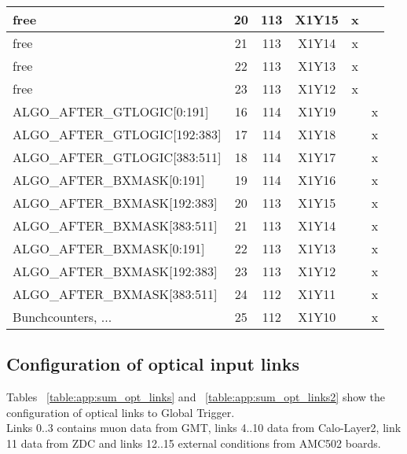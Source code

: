 \begin{longtable}{|l|c|c|c|c|c|}
free & 20  & 113 & X1Y15 & x &   \\\hline
free & 21  & 113 & X1Y14 & x &   \\\hline
free & 22  & 113 & X1Y13 & x &   \\\hline
free & 23  & 113 & X1Y12 & x &   \\\hline\hline
ALGO\_AFTER\_GTLOGIC[0:191] & 16  & 114 & X1Y19 &   & x \\\hline
ALGO\_AFTER\_GTLOGIC[192:383] & 17  & 114 & X1Y18 &   & x \\\hline
ALGO\_AFTER\_GTLOGIC[383:511] & 18  & 114 & X1Y17 &   & x \\\hline
ALGO\_AFTER\_BXMASK[0:191] & 19  & 114 & X1Y16 &   & x \\\hline
ALGO\_AFTER\_BXMASK[192:383] & 20  & 113 & X1Y15 &   & x \\\hline
ALGO\_AFTER\_BXMASK[383:511] & 21  & 113 & X1Y14 &   & x \\\hline
ALGO\_AFTER\_BXMASK[0:191] & 22  & 113 & X1Y13 &   & x \\\hline
ALGO\_AFTER\_BXMASK[192:383] & 23  & 113 & X1Y12 &   & x \\\hline
ALGO\_AFTER\_BXMASK[383:511] & 24  & 112 & X1Y11 &   & x \\\hline
Bunchcounters, ... & 25  & 112 & X1Y10 &   & x \\\hline
\end{longtable}

\clearpage

\subsection{Configuration of optical input links}\label{sec:app:app_b}

% 
% 

Tables ~\ref{table:app:sum_opt_links} and ~\ref{table:app:sum_opt_links2} show the configuration of optical links to Global Trigger.\\
Links 0..3 contains muon data from GMT, links 4..10 data from Calo-Layer2, link 11 data from ZDC and links 12..15 external conditions
from AMC502 boards.

